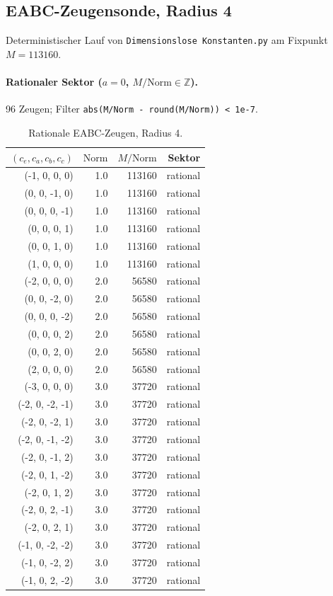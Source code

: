 \subsection{EABC-Zeugensonde, Radius 4}\label{sec:eabc-zeugen-r4}

Deterministischer Lauf von \texttt{Dimensionslose Konstanten.py} am Fixpunkt $M=113160$.

\paragraph{Rationaler Sektor ($a=0$, $M/\mathrm{Norm}\in\mathbb{Z}$).}
96 Zeugen; Filter \texttt{abs(M/Norm - round(M/Norm)) < 1e-7}.

\begin{table}[ht]
  \centering
  \caption{Rationale EABC-Zeugen, Radius 4.}
  \label{tab:eabc-rational-r4}
  \begin{tabular}{rrrr}
    \toprule
    $(c_e,c_a,c_b,c_c)$ & $\mathrm{Norm}$ & $M/\mathrm{Norm}$ & Sektor \\
    \midrule
    (-1, 0, 0, 0) & 1.0 & 113160 & rational \\
    (0, 0, -1, 0) & 1.0 & 113160 & rational \\
    (0, 0, 0, -1) & 1.0 & 113160 & rational \\
    (0, 0, 0, 1) & 1.0 & 113160 & rational \\
    (0, 0, 1, 0) & 1.0 & 113160 & rational \\
    (1, 0, 0, 0) & 1.0 & 113160 & rational \\
    (-2, 0, 0, 0) & 2.0 & 56580 & rational \\
    (0, 0, -2, 0) & 2.0 & 56580 & rational \\
    (0, 0, 0, -2) & 2.0 & 56580 & rational \\
    (0, 0, 0, 2) & 2.0 & 56580 & rational \\
    (0, 0, 2, 0) & 2.0 & 56580 & rational \\
    (2, 0, 0, 0) & 2.0 & 56580 & rational \\
    (-3, 0, 0, 0) & 3.0 & 37720 & rational \\
    (-2, 0, -2, -1) & 3.0 & 37720 & rational \\
    (-2, 0, -2, 1) & 3.0 & 37720 & rational \\
    (-2, 0, -1, -2) & 3.0 & 37720 & rational \\
    (-2, 0, -1, 2) & 3.0 & 37720 & rational \\
    (-2, 0, 1, -2) & 3.0 & 37720 & rational \\
    (-2, 0, 1, 2) & 3.0 & 37720 & rational \\
    (-2, 0, 2, -1) & 3.0 & 37720 & rational \\
    (-2, 0, 2, 1) & 3.0 & 37720 & rational \\
    (-1, 0, -2, -2) & 3.0 & 37720 & rational \\
    (-1, 0, -2, 2) & 3.0 & 37720 & rational \\
    (-1, 0, 2, -2) & 3.0 & 37720 & rational \\
    \bottomrule
  \end{tabular}
\end{table}

